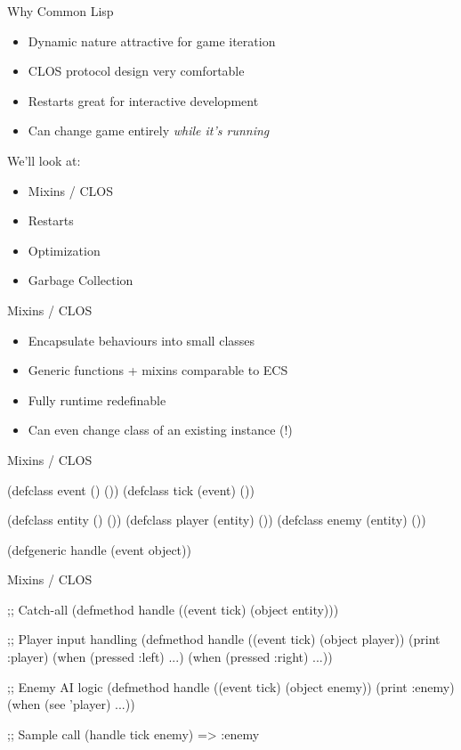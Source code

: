 \documentclass[14pt,t,aspectratio=169]{beamer}
\renewcommand{\title}[1]{
  {\huge #1} \vskip 0.4cm
}
\begin{document}
\begin{frame}
  \title{Why Common Lisp}
  \begin{itemize}
  \item Dynamic nature attractive for game iteration
  \item CLOS protocol design very comfortable
  \item Restarts great for interactive development
  \item Can change game entirely \textit{while it's running}
  \end{itemize}
  \pause\vfill
  We'll look at:
  \begin{itemize}
  \item Mixins / CLOS
  \item Restarts
  \item Optimization
  \item Garbage Collection
  \end{itemize}
\end{frame}

\begin{frame}
  \title{Mixins / CLOS}
  \begin{itemize}
  \item Encapsulate behaviours into small classes
  \item Generic functions + mixins comparable to ECS
  \item Fully runtime redefinable
  \item Can even change class of an existing instance (!)
  \end{itemize}
\end{frame}

\begin{frame}[fragile]
  \title{Mixins / CLOS}
\begin{lispcode}
(defclass event () ())
(defclass tick (event) ())

(defclass entity () ())
(defclass player (entity) ())
(defclass enemy (entity) ())

(defgeneric handle (event object))
\end{lispcode}
\end{frame}

\begin{frame}[fragile]
  \title{Mixins / CLOS}
\begin{lispcode}
;; Catch-all
(defmethod handle ((event tick) (object entity)))

;; Player input handling
(defmethod handle ((event tick) (object player))
  (print :player)
  (when (pressed :left) ...)
  (when (pressed :right) ...))

;; Enemy AI logic
(defmethod handle ((event tick) (object enemy))
  (print :enemy)
  (when (see 'player) ...))

;; Sample call
(handle tick enemy)
=> :enemy
\end{lispcode}
\end{frame}
\end{document}
